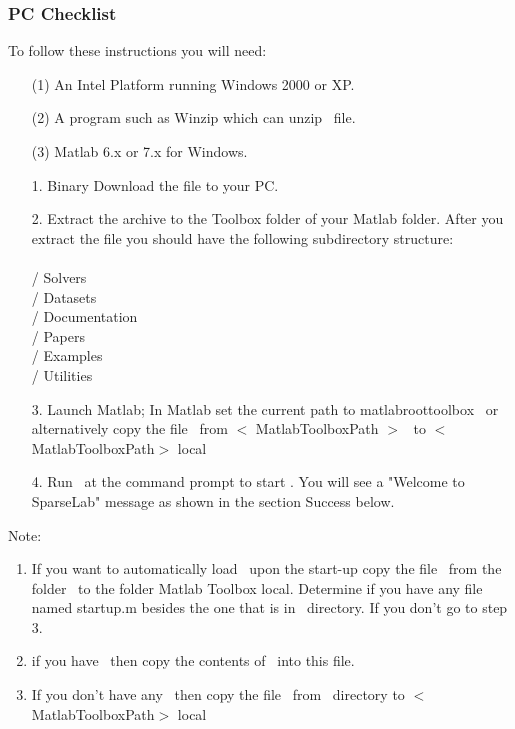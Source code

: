 \documentclass{article}
\begin{document}
\subsubsection{PC Checklist}
To follow these instructions you will need:
\begin{itemize}
\item[(1)] An Intel Platform running Windows 2000 or XP.
\item[(2)] A program such as Winzip which can unzip \dotzip\
file.
\item[(3)] Matlab 6.x or 7.x for Windows.
\end{itemize}
\begin{enumerate}
\item[1.] Binary Download the file {\tt \WLName \dotzip} to your
PC.
\item[2.] Extract the archive to the Toolbox folder of your Matlab
folder. After you extract the file you should have the following
subdirectory structure: \\
\WLName \\
\WLName / Solvers\\
\WLName / Datasets \\
\WLName / Documentation\\
\WLName / Papers\\
\WLName / Examples\\
\WLName / Utilities \\

\item[3.] Launch Matlab; In Matlab set the current path to
matlabroot\BS toolbox \BS \WLName\ or alternatively copy the file
\WavePath\ from $<$ MatlabToolboxPath $>$ \BS \WLName\ to
$<$MatlabToolboxPath$>$ \BS local
\item[4.] Run \WavePath\ at the command prompt to start \WaveLab. You will see a
"Welcome to SparseLab" message as shown in the section Success
below.
\end{enumerate}

Note: \\
\begin{enumerate}
\item If you want to automatically load \WLName\ upon the start-up
copy the file \WavePath\ from the folder \WLName\ to the folder
Matlab \BS Toolbox \BS local. Determine if you have any file named
startup.m besides the one that is in \WLName\ directory. If you
don't go to
step 3.\\
 \item if you have \Startup\, then copy the contents of \WavePath\
 into this file.
 \item If you don't have any \Startup\, then copy the file \Startup\ from \WLName\ directory to
 $<$MatlabToolboxPath$>$ \BS local
 \end{enumerate}
\end{document}
